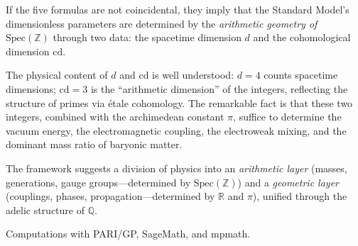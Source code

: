 \documentclass[aps,prl,twocolumn,superscriptaddress,nofootinbib]{revtex4-2}
\newcommand{\Spec}{\mathrm{Spec}}
\newcommand{\cd}{\mathrm{cd}}
\newcommand{\Z}{\mathbb{Z}}
\newcommand{\Q}{\mathbb{Q}}
\begin{document}
If the five formulas are not coincidental,
they imply that the Standard Model's dimensionless parameters
are determined by the \emph{arithmetic geometry of $\Spec(\Z)$}
through two data:
the spacetime dimension $d$ and the cohomological dimension $\cd$.

The physical content of $d$ and $\cd$ is well understood:
$d = 4$ counts spacetime dimensions;
$\cd = 3$ is the ``arithmetic dimension'' of the integers,
reflecting the structure of primes via \'etale cohomology.
The remarkable fact is that these two integers, combined with
the archimedean constant $\pi$, suffice to determine
the vacuum energy, the electromagnetic coupling,
the electroweak mixing, and the dominant mass ratio
of baryonic matter.

The framework suggests a division of physics into an
\emph{arithmetic layer} (masses, generations, gauge groups---determined
by $\Spec(\Z)$) and a \emph{geometric layer}
(couplings, phases, propagation---determined by $\mathbb{R}$ and $\pi$),
unified through the adelic structure of $\Q$.

\begin{acknowledgments}
Computations with PARI/GP, SageMath, and mpmath.
\end{acknowledgments}
\end{document}
